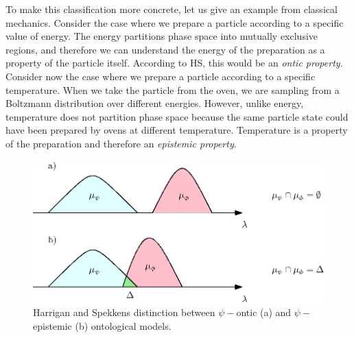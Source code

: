 \documentclass[twocolumn,prl,floatfix,superscriptaddress]{revtex4-2}
\begin{document}
To make this classification more concrete, let us give an example from classical mechanics. Consider the case where we prepare a particle according to a specific value of energy. The energy partitions phase space into mutually exclusive regions, and therefore we can understand the energy of the preparation as a property of the particle itself. According to HS, this would be an \emph{ontic property}. Consider now the case where we prepare a particle according to a specific temperature. When we take the particle from the oven, we are sampling from a Boltzmann distribution over different energies. However, unlike energy, temperature does not partition phase space because the same particle state could have been prepared by ovens at different temperature. Temperature is a property of the preparation and therefore an \emph{epistemic property}. 


\begin{figure}
\includegraphics[scale=.7]{ontic}
\caption{\footnotesize{Harrigan and Spekkens distinction between $\psi-$ontic (a) and $\psi-$epistemic (b) ontological models.}}\label{overlap}
\end{figure}
\end{document}
